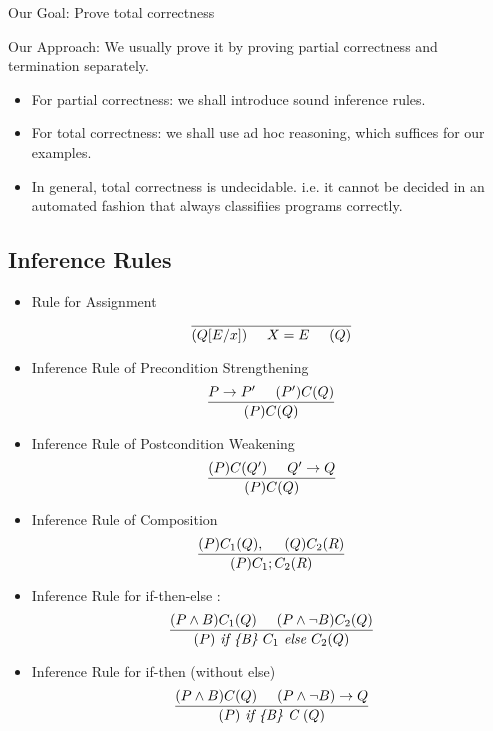 \documentclass{article}
\begin{document}
Our Goal: Prove total correctness

Our Approach: We usually prove it by proving partial correctness
and termination separately.

\begin{itemize}
\item For partial correctness: we shall introduce sound inference rules.
\item For total correctness: we shall use ad hoc reasoning, which
suffices for our examples.
\item In general, total correctness is undecidable. i.e. it cannot be
decided in an automated fashion that always classifiies
programs correctly.
\end{itemize}

\subsection{Inference Rules}
\begin{itemize}
\item Rule for Assignment
$$ \frac{}{(Q [E/x])\hspace{0.5cm} X = E \hspace{0.5cm} (Q)} $$
\item Inference Rule of Precondition Strengthening 
$$ \frac{P \rightarrow P^\prime \hspace{0.5cm} (P^\prime) C (Q)}{(P) C (Q)}$$
\item Inference Rule of Postcondition Weakening
$$ \frac{(P)C(Q^\prime) \hspace{0.5cm} Q^\prime \rightarrow Q}{(P) C (Q)}$$
\item Inference Rule of Composition 
$$ \frac{(P)C_1 (Q), \hspace{0.5cm} (Q) C_2 (R) }{(P) C_1 ; C_2 (R)}$$
\item Inference Rule for if-then-else : 
$$ \frac{(P \wedge B) C_1 (Q) \hspace{0.5cm} (P \wedge \neg B) C_2 (Q)}{(P) \textit{ if \{B\} } C_1 \textit{ else } C_2 (Q)}$$
\item Inference Rule for if-then (without else) 
$$ \frac{(P \wedge B) C (Q) \hspace{0.5cm} (P \wedge \neg B) \rightarrow Q }{(P) \textit{ if \{B\} C } (Q)}$$
\end{itemize}
\end{document}
